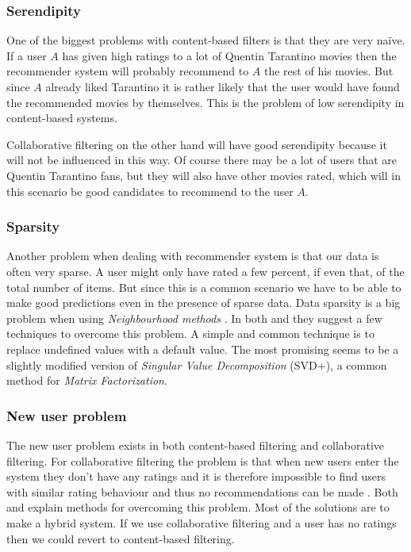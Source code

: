 \documentclass[a4paper,11pt]{article}
\begin{document}
\subsubsection{Serendipity}
One of the biggest problems with content-based filters is that they are very na\"ive. If a user $A$ has given high ratings to a lot of Quentin Tarantino movies then the recommender system will probably recommend to $A$ the rest of his movies. But since $A$ already liked Tarantino it is rather likely that the user would have found the recommended movies by themselves. This is the problem of low serendipity in content-based systems.

Collaborative filtering on the other hand will have good serendipity because it will not be influenced in this way. Of course there may be a lot of users that are Quentin Tarantino fans, but they will also have other movies rated, which will in this scenario be good candidates to recommend to the user $A$.

\subsubsection{Sparsity}
Another problem when dealing with recommender system is that our data is often
very sparse. A user might only have rated a few percent, if even that, of the total
number of items. But since this is a common scenario we have to be able to make
good predictions even in the presence of sparse data. Data sparsity is a big problem when using \emph{Neighbourhood methods} \cite{springerlink:10.1007/978-0-387-85820-3_1}. In both \cite{1423975} and \cite{springerlink:10.1007/978-0-387-85820-3_1} they suggest a few techniques to overcome this problem. A simple and common technique is to replace undefined values with a default value. The most promising seems to be a slightly modified version of \emph{Singular Value Decomposition} (SVD+), a common method for \emph{Matrix Factorization}.

\subsubsection{New user problem}
The new user problem exists in both content-based filtering and collaborative filtering. For collaborative filtering the problem is that when new users enter the system they don't have any ratings and it is therefore impossible to find users with similar rating behaviour and thus no recommendations can be made \cite{1423975}. Both \cite{1423975} and \cite{springerlink:10.1007/978-0-387-85820-3_1} explain methods for overcoming this problem. Most of the solutions are to make a hybrid system. If we use collaborative filtering and a user has no ratings then we could revert to content-based filtering.
\end{document}
